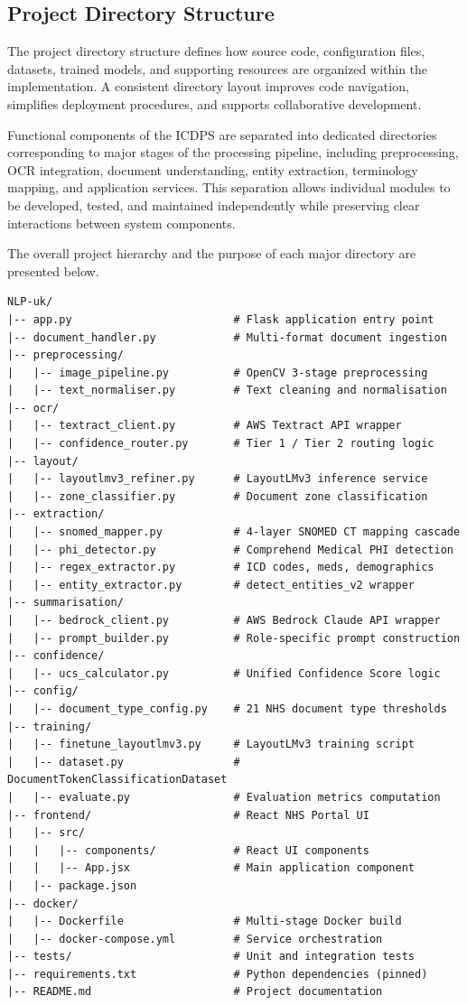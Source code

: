 \subsection{Project Directory Structure}

The project directory structure defines how source code, configuration files, datasets, trained models, and supporting resources are organized within the implementation. A consistent directory layout improves code navigation, simplifies deployment procedures, and supports collaborative development.

Functional components of the ICDPS are separated into dedicated directories corresponding to major stages of the processing pipeline, including preprocessing, OCR integration, document understanding, entity extraction, terminology mapping, and application services. This separation allows individual modules to be developed, tested, and maintained independently while preserving clear interactions between system components.

The overall project hierarchy and the purpose of each major directory are presented below.

\begin{lstlisting}
NLP-uk/
|-- app.py                         # Flask application entry point
|-- document_handler.py            # Multi-format document ingestion
|-- preprocessing/
|   |-- image_pipeline.py          # OpenCV 3-stage preprocessing
|   |-- text_normaliser.py         # Text cleaning and normalisation
|-- ocr/
|   |-- textract_client.py         # AWS Textract API wrapper
|   |-- confidence_router.py       # Tier 1 / Tier 2 routing logic
|-- layout/
|   |-- layoutlmv3_refiner.py      # LayoutLMv3 inference service
|   |-- zone_classifier.py         # Document zone classification
|-- extraction/
|   |-- snomed_mapper.py           # 4-layer SNOMED CT mapping cascade
|   |-- phi_detector.py            # Comprehend Medical PHI detection
|   |-- regex_extractor.py         # ICD codes, meds, demographics
|   |-- entity_extractor.py        # detect_entities_v2 wrapper
|-- summarisation/
|   |-- bedrock_client.py          # AWS Bedrock Claude API wrapper
|   |-- prompt_builder.py          # Role-specific prompt construction
|-- confidence/
|   |-- ucs_calculator.py          # Unified Confidence Score logic
|-- config/
|   |-- document_type_config.py    # 21 NHS document type thresholds
|-- training/
|   |-- finetune_layoutlmv3.py     # LayoutLMv3 training script
|   |-- dataset.py                 # DocumentTokenClassificationDataset
|   |-- evaluate.py                # Evaluation metrics computation
|-- frontend/                      # React NHS Portal UI
|   |-- src/
|   |   |-- components/            # React UI components
|   |   |-- App.jsx                # Main application component
|   |-- package.json
|-- docker/
|   |-- Dockerfile                 # Multi-stage Docker build
|   |-- docker-compose.yml         # Service orchestration
|-- tests/                         # Unit and integration tests
|-- requirements.txt               # Python dependencies (pinned)
|-- README.md                      # Project documentation
\end{lstlisting}

